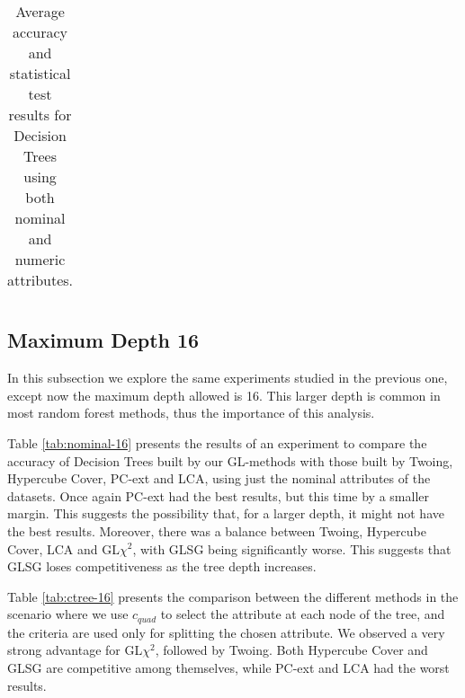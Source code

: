 \begin{table}
\begin{tabular}{c|cc|cc|cc|cc|cc|cc}
\end{tabular}
\caption{Average accuracy and statistical test results for  Decision Trees using both nominal and numeric attributes.}
\label{exp:numeric-5}
\normalsize
\end{table}


\subsection{Maximum Depth 16}

In this subsection we explore the same experiments studied in the previous one, except now the maximum depth allowed is 16. This larger depth is common in most random forest methods, thus the importance of this analysis.

Table \ref{tab:nominal-16} presents the results of an experiment to compare the accuracy of  Decision Trees built by our GL-methods with those built by Twoing, Hypercube Cover, PC-ext and LCA, using just the nominal attributes of the datasets. Once again PC-ext had the best results, but this time by a smaller margin. This suggests the possibility that, for a larger depth, it might not have the best results. Moreover, there was a balance between Twoing, Hypercube Cover, LCA and GL$\chi^2$, with GLSG being significantly worse. This suggests that GLSG loses competitiveness as the tree depth increases.

Table \ref{tab:ctree-16} presents the comparison between the different methods in the scenario where we use $c_{quad}$ to select the attribute at each node of the tree, and the criteria are used only for splitting the chosen attribute. We observed a very strong advantage for GL$\chi^2$, followed by Twoing. Both Hypercube Cover and GLSG are competitive among themselves, while PC-ext and LCA had the worst results.


